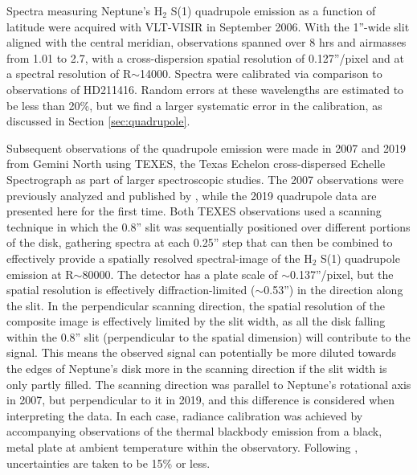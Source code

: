 \documentclass[twocolumn,10pt]{aastex631}
\begin{document}
Spectra measuring Neptune's H$_2$ S(1) quadrupole emission as a function of latitude were acquired with VLT-VISIR in September 2006.  With the 1''-wide slit aligned with the central meridian, observations spanned over 8 hrs and airmasses from 1.01 to 2.7, with a cross-dispersion spatial resolution of 0.127''/pixel and at a spectral resolution of R$\sim$14000.  Spectra were calibrated via comparison to observations of HD211416.  Random errors at these wavelengths are estimated to be less than 20\%, but we find a larger systematic error in the calibration, as discussed in Section \ref{sec:quadrupole}. 

Subsequent observations of the quadrupole emission were made in 2007 and 2019 from Gemini North using TEXES, the Texas Echelon cross-dispersed Echelle Spectrograph \citep{lacy2002texes} as part of larger spectroscopic studies. The 2007 observations were previously analyzed and published by \citet{greathouse2011spatially}, while the 2019 quadrupole data are presented here for the first time.  Both TEXES observations used a scanning technique in which the 0.8'' slit was sequentially positioned over different portions of the disk, gathering spectra at each 0.25'' step that can then be combined to effectively provide a spatially resolved spectral-image of the H$_2$ S(1) quadrupole emission at R$\sim$80000.  The detector has a plate scale of $\sim$0.137''/pixel, but the spatial resolution is effectively diffraction-limited ($\sim$0.53'') in the direction along the slit. In the perpendicular scanning direction, the spatial resolution of the composite image is effectively limited by the slit width, as all the disk falling within the 0.8'' slit (perpendicular to the spatial dimension) will contribute to the signal. This means the observed signal can potentially be more diluted towards the edges of Neptune's disk more in the scanning direction if the slit width is only partly filled. The scanning direction was parallel to Neptune's rotational axis in 2007, but perpendicular to it in 2019, and this difference is considered when interpreting the data.  In each case, radiance calibration was achieved by accompanying observations of the thermal blackbody emission from a black, metal plate at ambient temperature within the observatory. Following \citet{greathouse2011spatially}, uncertainties are taken to be 15\% or less. 

\end{document}
